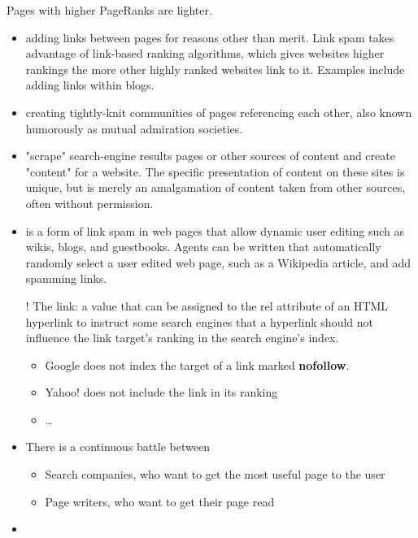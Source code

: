 \documentclass[a4paper,landscape,headrule,footrule,xetex]{foils}
\begin{document}
Pages with higher PageRanks are lighter. 

\MyLogo{}
\begin{itemize}
\item {} adding links between pages for reasons other
  than merit.  Link spam takes advantage of link-based ranking
  algorithms, which gives websites higher rankings the more other
  highly ranked websites link to it.  Examples include adding links
  within blogs.
\item {} creating tightly-knit communities of pages
  referencing each other, also known humorously as mutual admiration
  societies.
\item {}  "scrape" search-engine results pages or other sources of content and create "content" for a website. The specific presentation of content on these sites is unique, but is merely an amalgamation of content taken from other sources, often without permission.
\newpage
\item {} is a form of link spam in web pages that
  allow dynamic user editing such as wikis, blogs, and guestbooks.
  Agents can be written that automatically randomly select a user
  edited web page, such as a Wikipedia article, and add spamming
  links.
\end{itemize}

\begin{itemize}
\item[!] The  link: a value that can be assigned to the rel
attribute of an HTML hyperlink to instruct some search engines that a
hyperlink should not influence the link target's ranking in the search
  engine's index.
  \begin{itemize}
  \item Google does not index the target of a link marked \textbf{nofollow}.
  \item Yahoo! does not include the link in its ranking
  \item \ldots
  \end{itemize}
\end{itemize}


\begin{itemize}
\item There is a continuous battle between 
  \begin{itemize}
  \item Search companies, who want to get the most useful page to the user
  \item Page writers, who want to get their page read
  \end{itemize}
\item {}
\end{itemize}
\end{document}
